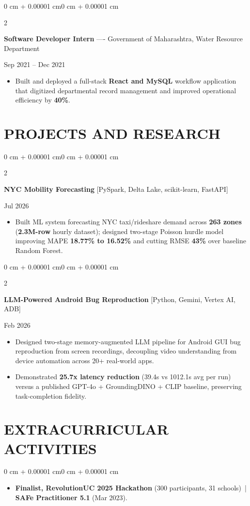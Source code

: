 \documentclass[10pt, letterpaper]{article}
\newenvironment{highlights}{
    \begin{itemize}[
        topsep=0.10 cm,
        parsep=0.06 cm,
        partopsep=0pt,
        itemsep=0.06 cm,
        leftmargin=12pt
    ]
}{
    \end{itemize}
}
\newenvironment{onecolentry}{
    \begin{adjustwidth}{0 cm + 0.00001 cm}{0 cm + 0.00001 cm}
}{
    \end{adjustwidth}
}
\newenvironment{twocolentry}[2][]{
    \onecolentry
    \def\secondColumn{#2}
    \setcolumnwidth{\fill, 4.5 cm}
    \begin{paracol}{2}
}{
    \switchcolumn \raggedleft \secondColumn
    \end{paracol}
    \endonecolentry
}
\begin{document}
\begin{twocolentry}{Sep 2021 -- Dec 2021}
\textbf{Software Developer Intern} ---- Government of Maharashtra, Water Resource Department
\end{twocolentry}
\begin{highlights}
  \item Built and deployed a full-stack \textbf{React and MySQL} workflow application that digitized departmental record management and improved operational efficiency by \textbf{40\%}.
\end{highlights}

\section{PROJECTS AND RESEARCH}
\begin{twocolentry}{Jul 2026}
\textbf{NYC Mobility Forecasting} [PySpark, Delta Lake, scikit-learn, FastAPI]
\end{twocolentry}
\begin{highlights}
  \item Built ML system forecasting NYC taxi/rideshare demand across \textbf{263 zones} (\textbf{2.3M-row} hourly dataset); designed two-stage Poisson hurdle model improving MAPE \textbf{18.77\% to 16.52\%} and cutting RMSE \textbf{43\%} over baseline Random Forest.
\end{highlights}

\vspace{0.12 cm}

\begin{twocolentry}{Feb 2026}
\textbf{LLM-Powered Android Bug Reproduction} [Python, Gemini, Vertex AI, ADB]
\end{twocolentry}
\begin{highlights}
  \item Designed two-stage memory-augmented LLM pipeline for Android GUI bug reproduction from screen recordings, decoupling video understanding from device automation across 20+ real-world apps.
  \item Demonstrated \textbf{25.7x latency reduction} (39.4s vs 1012.1s avg per run) versus a published GPT-4o + GroundingDINO + CLIP baseline, preserving task-completion fidelity.
\end{highlights}

\section{EXTRACURRICULAR ACTIVITIES}
\begin{onecolentry}
\begin{highlights}
  \item \textbf{Finalist, RevolutionUC 2025 Hackathon} (300 participants, 31 schools) \,|\, \textbf{SAFe Practitioner 5.1} (Mar 2023).
\end{highlights}
\end{onecolentry}
\end{document}
